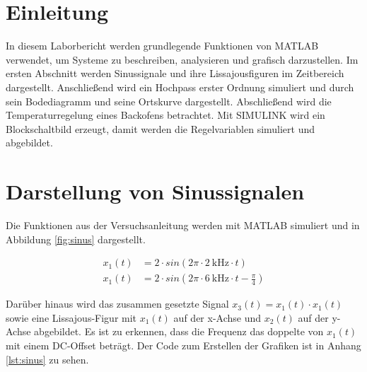 \documentclass[
    paper=a4,
    fontsize=10pt,
    DIV=13,
    oneside,
]{scrartcl}
\date{\today}
\begin{document}
\maketitle




\section{Einleitung}
    In diesem Laborbericht werden grundlegende Funktionen von MATLAB verwendet, um Systeme zu beschreiben, analysieren und grafisch darzustellen. Im ersten Abschnitt werden Sinussignale und ihre Lissajousfiguren im Zeitbereich dargestellt. Anschließend wird ein Hochpass erster Ordnung simuliert und durch sein Bodediagramm und seine Ortskurve dargestellt. Abschließend wird die Temperaturregelung eines Backofens betrachtet. Mit SIMULINK wird ein Blockschaltbild erzeugt, damit werden die Regelvariablen simuliert und abgebildet.

\section{Darstellung von Sinussignalen}
    Die Funktionen aus der Versuchsanleitung \cite{versuch1} werden mit MATLAB simuliert und in Abbildung \ref{fig:sinus} dargestellt.

    \begin{align}
        x_1(t) &= 2 \cdot sin(2\pi \cdot \SI{2}{\kilo\hertz} \cdot t)\\
        x_1(t) &= 2 \cdot sin(2\pi \cdot \SI{6}{\kilo\hertz} \cdot t - \frac{\pi}{4})
    \end{align}

    Darüber hinaus wird das zusammen gesetzte Signal \(x_3(t)=x_1(t) \cdot x_1(t)\) sowie eine Lissajous-Figur mit \(x_1(t)\) auf der x-Achse und \(x_2(t)\) auf der y-Achse abgebildet. Es ist zu erkennen, dass die Frequenz das doppelte von \(x_1(t)\) mit einem DC-Offset beträgt. Der Code zum Erstellen der Grafiken ist in Anhang \ref{lst:sinus} zu sehen.
\end{document}
